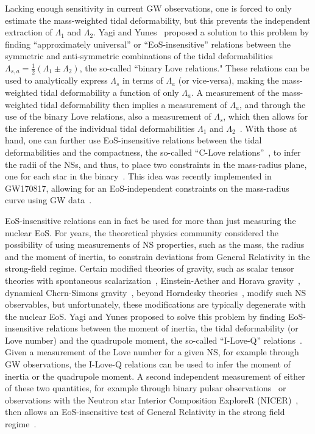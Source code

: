 \documentclass[prd,twocolumn,nofootinbib,superscriptaddress,amsmath,amssymb]{revtex4-1}
\begin{document}
Lacking enough sensitivity in current GW observations, one is forced to only estimate the mass-weighted tidal deformability, but this prevents the independent extraction of $\Lambda_{1}$ and $\Lambda_{2}$. Yagi and Yunes~\cite{Yagi:binLove} proposed a solution to this problem by finding ``approximately universal'' or ``EoS-insensitive'' relations between the symmetric and anti-symmetric combinations of the tidal deformabilities $\Lambda_{s,a}=\frac{1}{2}(\Lambda_1 \pm \Lambda_2)$, the so-called ``binary Love relations." These relations can be used to analytically express $\Lambda_{s}$ in terms of $\Lambda_{a}$ (or vice-versa), making the mass-weighted tidal deformability a function of only $\Lambda_{a}$. A measurement of the mass-weighted tidal deformability then implies a measurement of $\Lambda_{a}$, and through the use of the binary Love relations, also a measurement of $\Lambda_{s}$, which then allows for the inference of the individual tidal deformabilities $\Lambda_{1}$ and $\Lambda_{2}$~\cite{Yagi:binLove}. With those at hand, one can further use EoS-insensitive relations between the tidal deformabilities and the compactness, the so-called ``C-Love relations''~\cite{Yagi:ILQ}, to infer the radii of the NSs, and thus, to place two constraints in the mass-radius plane, one for each star in the binary~\cite{Yagi:binLove}. This idea was recently implemented in GW170817, allowing for an EoS-independent constraints on the mass-radius curve using GW data~\cite{Katerina:residuals,LIGO:posterior}.     

EoS-insensitive relations can in fact be used for more than just measuring the nuclear EoS. For years, the theoretical physics community considered the possibility of using measurements of NS properties, such as the mass, the radius and the moment of inertia, to constrain deviations from General Relativity in the strong-field regime. Certain modified theories of gravity, such as scalar tensor theories with spontaneous scalarization~\cite{Damour:1996ke}, Einstein-Aether and Horava gravity~\cite{Eling:2007xh,Yagi:2013ava,Yagi:2013qpa}, dynamical Chern-Simons gravity~\cite{Yunes:2009ch}, beyond Horndesky theories~\cite{Sakstein:2016oel}, modify such NS observables, but unfortunately, these modifications are typically degenerate with the nuclear EoS. Yagi and Yunes proposed to solve this problem by finding EoS-insensitive relations between the moment of inertia, the tidal deformability (or Love number) and the quadrupole moment, the so-called ``I-Love-Q'' relations~\cite{Yagi:ILQ}. Given a measurement of the Love number for a given NS, for example through GW observations, the I-Love-Q relations can be used to infer the moment of inertia or the quadrupole moment. A second independent measurement of either of these two quantities, for example through binary pulsar observations~\cite{Lattimer:2004nj} or observations with the Neutron star Interior Composition ExploreR (NICER)~\cite{Ozel:2015ykl}, then allows an EoS-insensitive test of General Relativity in the strong field regime~\cite{Yagi:ILQ,Gupta:2017vsl}. 
\end{document}
